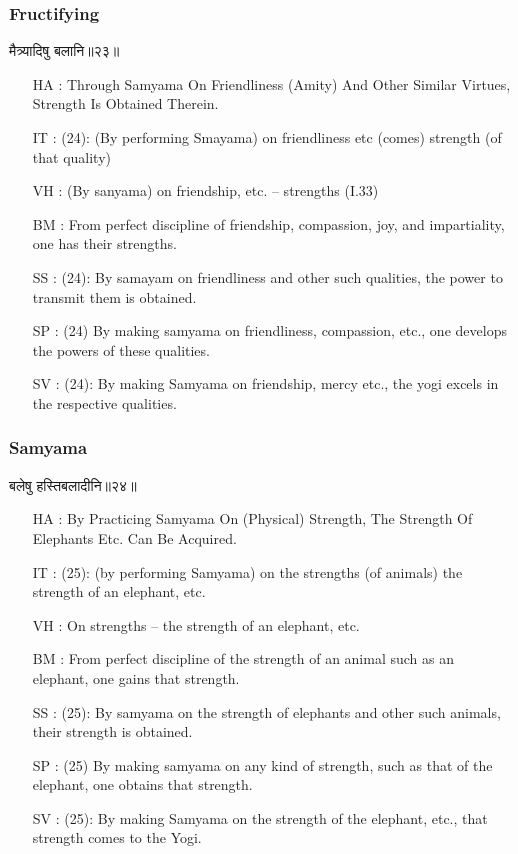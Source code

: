 \begin{frame}[fragile]\frametitle{Fructifying}
\begin{sanskrit}
मैत्र्यादिषु बलानि॥२३॥
\end{sanskrit}

	\begin{itemize}
	\item [HA]: Through Samyama On Friendliness (Amity) And Other Similar Virtues, Strength Is Obtained Therein.
	\item [IT]: (24): (By performing Smayama) on friendliness etc (comes) strength (of that quality)
	\item [VH]: (By sanyama) on friendship, etc. – strengths (I.33)
	\item [BM]: From perfect discipline of friendship, compassion, joy, and impartiality, one has their strengths.
	\item [SS]: (24): By samayam on friendliness and other such qualities, the power to transmit them is obtained.
	\item [SP]: (24) By making samyama on friendliness, compassion, etc., one develops the powers of these qualities.
	\item [SV]: (24): By making Samyama on friendship, mercy etc., the yogi excels in the respective qualities.
	\end{itemize}
	
\end{frame}


\begin{frame}[fragile]\frametitle{Samyama}
\begin{sanskrit}
बलेषु हस्तिबलादीनि॥२४॥
\end{sanskrit}

	\begin{itemize}
	\item [HA]: By Practicing Samyama On (Physical) Strength, The Strength Of Elephants Etc. Can Be Acquired.
	\item [IT]: (25): (by performing Samyama) on the strengths (of animals) the strength of an elephant, etc.
	\item [VH]: On strengths – the strength of an elephant, etc.
	\item [BM]: From perfect discipline of the strength of an animal such as an elephant, one gains that strength.
	\item [SS]: (25): By samyama on the strength of elephants and other such animals, their strength is obtained.
	\item [SP]: (25) By making samyama on any kind of strength, such as that of the elephant, one obtains that strength.
	\item [SV]: (25): By making Samyama on the strength of the elephant, etc., that strength comes to the Yogi. 
	\end{itemize}

\end{frame}

